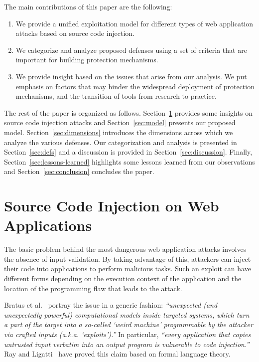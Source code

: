 \documentclass[conference]{IEEEtran}
\begin{document}
The main contributions of this paper are the following:

\begin{enumerate}
\item We provide a unified exploitation model for different types of
  web application attacks based on source code injection.
\item We categorize and analyze proposed defenses using a set of
  criteria that are important for building protection mechanisms.
\item We provide insight based on the issues that arise from our analysis. We put
  emphasis on factors that may hinder the widespread deployment of
  protection mechanisms, and the transition of tools from research to practice.
\end{enumerate}

The rest of the paper is organized as follows.
Section~\ref{sec:attacks} provides some insights on
source code injection attacks and
Section~\ref{sec:model} presents our proposed model.
Section~\ref{sec:dimensions} introduces the dimensions
across which we analyze the various defenses.
Our categorization and analysis is presented in
Section~\ref{sec:defs} and a discussion is provided in
Section~\ref{sec:discussion}. Finally,
Section~\ref{sec:lessons-learned} highlights
some lessons learned from our observations
and Section~\ref{sec:conclusion} concludes the paper.

\section{Source Code Injection on Web Applications}
\label{sec:attacks}

The basic problem behind the most dangerous
web application attacks involves
the absence of input validation. By taking advantage of
this, attackers can inject their code into
applications to perform malicious tasks. Such
an exploit can have different forms depending on the
execution context of the application and the location
of the programming flaw that leads to the attack.

Bratus et al.~\cite{BLSPS11} portray the issue in a generic fashion:
{\it ``unexpected (and unexpectedly powerful) computational models
  inside targeted systems, which turn a part of the target into a
  so-called `weird machine' programmable by the attacker via crafted
  inputs (a.k.a. `exploits').''} In particular, {\it ``every
  application that copies untrusted input verbatim into an output
  program is vulnerable to code injection.''} Ray and
Ligatti~\cite{RL12b} have proved this claim based on formal language
theory.
\end{document}
